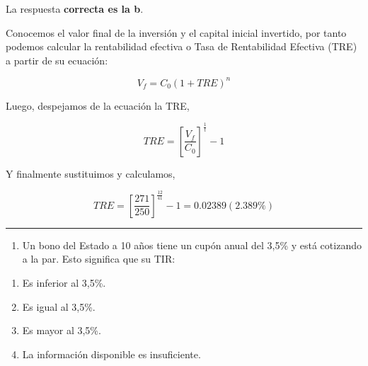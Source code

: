 \documentclass[
  letterpaper,
  DIV=11,
  numbers=noendperiod]{scrreprt}
\providecommand{\tightlist}{%
  \setlength{\itemsep}{0pt}\setlength{\parskip}{0pt}}\usepackage{longtable,booktabs,array}
\begin{document}
\begin{tcolorbox}[enhanced jigsaw, left=2mm, opacityback=0, colback=white, breakable, arc=.35mm, bottomrule=.15mm, rightrule=.15mm, toprule=.15mm, leftrule=.75mm, colframe=quarto-callout-tip-color-frame]
\begin{minipage}[t]{5.5mm}
\textcolor{quarto-callout-tip-color}{\faLightbulb}
\end{minipage}%
\begin{minipage}[t]{\textwidth - 5.5mm}

La respuesta \textbf{correcta es la b}.

Conocemos el valor final de la inversión y el capital inicial invertido,
por tanto podemos calcular la rentabilidad efectiva o Tasa de
Rentabilidad Efectiva (TRE) a partir de su ecuación:

\[{ V }_{ f }={ C }_{ 0 }{ (1+TRE) }^{ n }\]

Luego, despejamos de la ecuación la TRE,

\[{ { { TRE=}\left[ \frac { { V}_{ f } }{ { C }_{ 0 } }  \right]  }^{ \frac { 1 }{ t }  } }-1\]

Y finalmente sustituimos y calculamos,

\[{ { { TRE=}\left[ \frac {271}{ 250 }  \right]  }^{ \frac { 12 }{ 41 }  } }-1=0.02389(2.389\%)\]

\end{minipage}%
\end{tcolorbox}

\begin{center}\rule{0.5\linewidth}{0.5pt}\end{center}

\begin{enumerate}
\def\labelenumi{\arabic{enumi}.}
\setcounter{enumi}{40}
\tightlist
\item
  Un bono del Estado a 10 años tiene un cupón anual del 3,5\% y está
  cotizando a la par. Esto significa que su TIR:
\end{enumerate}

\begin{enumerate}
\def\labelenumi{\alph{enumi})}
\item
  Es inferior al 3,5\%.
\item
  Es igual al 3,5\%.
\item
  Es mayor al 3,5\%.
\item
  La información disponible es insuficiente.
\end{enumerate}
\end{document}
